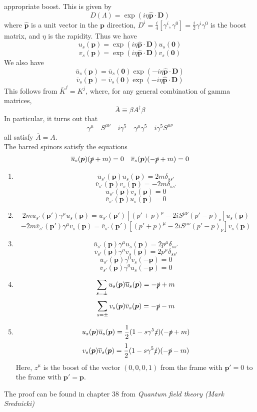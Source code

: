 \documentclass[cyan]{elegantnote}
\begin{document}
appropriate boost. This is given by
\[D(\Lambda) = \exp(i\eta \hat{\bm{p}} \cdot \bm{D})\]
where $\hat{\bm{p}}$ is a unit vector in the $\bm{p}$ direction, $D^i = \frac{i}{4}[\gamma^i,\gamma^0] = \frac{i}{2} \gamma^i \gamma^0$ is the boost matrix, and $\eta$ is the rapidity. Thus we have
\[u_s(\bm{p}) = \exp(i\eta \hat{\bm{p}} \cdot \bm{D}) u_s(\bm{0})\]
\[v_s(\bm{p}) = \exp(i\eta \hat{\bm{p}} \cdot \bm{D}) v_s(\bm{0})\]
We also have
\[\overline{u}_s(\bm{p}) = \overline{u}_s(\bm{0}) \exp(-i\eta \hat{\bm{p}} \cdot \bm{D}) \]
\[\overline{v}_s(\bm{p}) = \overline{v}_s(\bm{0}) \exp(-i\eta \hat{\bm{p}} \cdot \bm{D}) \]
This follows from $\overline{K}^j = K^j$, where, for any general combination of gamma matrices,
\[\overline{A} \equiv \beta A^{\dagger} \beta\]
In particular, it turns out that
\[\gamma^{\mu} \quad S^{\mu \nu} \quad i\gamma^5  \quad \gamma^{\mu}\gamma^5 \quad i\gamma^5 S^{\mu \nu}\]
all satisfy $\overline{A} = A$.\\
The barred spinors satisfy the equations
\[\overline{u}_s(\bm{p})(\slashed{p}+m)=0 \quad \overline{v}_s(\bm{p})(-\slashed{p}+m)=0\]

\begin{newprop}
\begin{enumerate}
\item \[\overline{u}_{s'}(\bm{p}) u_s(\bm{p}) = 2m\delta_{ss'}\]
\[\overline{v}_{s'}(\bm{p}) v_s(\bm{p}) = -2m\delta_{ss'}\]
\[\overline{u}_{s'}(\bm{p}) v_s(\bm{p}) = 0\]
\[\overline{v}_{s'}(\bm{p}) u_s(\bm{p}) = 0\]
\item 
\[2m \overline{u}_{s'}(\bm{p}') \gamma^{\mu} u_s(\bm{p}) =  \overline{u}_{s'}(\bm{p}') [(p'+p)^{\mu} -2i S^{\mu \nu}(p'-p)_{\nu}]u_s(\bm{p})\]
\[-2m \overline{v}_{s'}(\bm{p}') \gamma^{\mu} v_s(\bm{p}) =  \overline{v}_{s'}(\bm{p}') [(p'+p)^{\mu} -2i S^{\mu \nu}(p'-p)_{\nu}]v_s(\bm{p})\]
\item   \[\overline{u}_{s'}(\bm{p}) \gamma^{\mu} u_s(\bm{p}) = 2p^{\mu} \delta_{ss'}\]
\[\overline{v}_{s'}(\bm{p}) \gamma^{\mu} v_s(\bm{p}) = 2p^{\mu} \delta_{ss'}\]
\[\overline{u}_{s'}(\bm{p}) \gamma^{0} v_s(-\bm{p}) = 0\]
\[\overline{v}_{s'}(\bm{p}) \gamma^{0} u_s(-\bm{p}) = 0\]
\item \[\sum_{s=\pm} u_s(\bm{p}) \overline{u}_s(\bm{p}) = - \slashed{p}+m \]
\[\sum_{s=\pm} v_s(\bm{p}) \overline{v}_s(\bm{p}) = - \slashed{p}-m \]
\item \[u_s(\bm{p}) \overline{u}_s(\bm{p}) =\frac{1}{2}(1-s\gamma^5\slashed{z})(-\slashed{p}+m)\]
 \[v_s(\bm{p}) \overline{v}_s(\bm{p}) =\frac{1}{2}(1-s\gamma^5\slashed{z})(-\slashed{p}-m)\]
Here, $z^{\mu}$ is the boost of the vector $(0,0,0,1)$ from the frame with $\bm{p}'=0$ to the frame with $\bm{p}'=\bm{p}$.  
\end{enumerate}
The proof can be found in chapter 38 from \emph{Quantum field theory (Mark Srednicki)}
\end{newprop}
\end{document}
